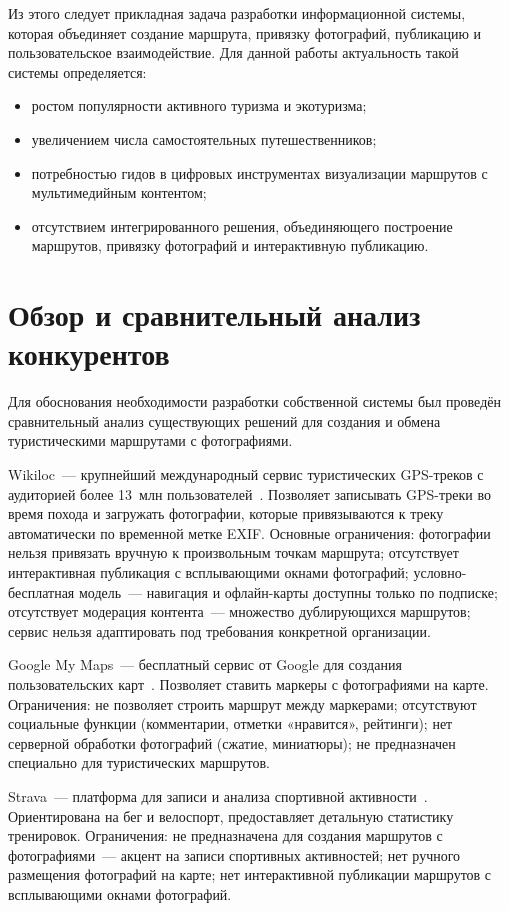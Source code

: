 Из этого следует прикладная задача разработки информационной системы, которая
объединяет создание маршрута, привязку фотографий, публикацию и пользовательское
взаимодействие. Для данной работы актуальность такой системы определяется:
\begin{itemize}
  \item ростом популярности активного туризма и экотуризма;
  \item увеличением числа самостоятельных путешественников;
  \item потребностью гидов в цифровых инструментах визуализации маршрутов с мультимедийным контентом;
  \item отсутствием интегрированного решения, объединяющего построение маршрутов, привязку фотографий и интерактивную публикацию.
\end{itemize}


\section{Обзор и сравнительный анализ конкурентов}
\label{sec:competitors}

Для обоснования необходимости разработки собственной системы был проведён сравнительный анализ существующих решений для создания и обмена туристическими маршрутами с фотографиями.

Wikiloc~--- крупнейший международный сервис туристических GPS-треков с аудиторией более 13~млн пользователей~\cite{wikiloc}. Позволяет записывать GPS-треки во время похода и загружать фотографии, которые привязываются к треку автоматически по временной метке EXIF. Основные ограничения: фотографии нельзя привязать вручную к произвольным точкам маршрута; отсутствует интерактивная публикация с всплывающими окнами фотографий; условно-бесплатная модель~--- навигация и офлайн-карты доступны только по подписке; отсутствует модерация контента~--- множество дублирующихся маршрутов; сервис нельзя адаптировать под требования конкретной организации.

Google My Maps~--- бесплатный сервис от Google для создания пользовательских карт~\cite{googlemymaps}. Позволяет ставить маркеры с фотографиями на карте. Ограничения: не позволяет строить маршрут между маркерами; отсутствуют социальные функции (комментарии, отметки «нравится», рейтинги); нет серверной обработки фотографий (сжатие, миниатюры); не предназначен специально для туристических маршрутов.

Strava~--- платформа для записи и анализа спортивной активности~\cite{strava}. Ориентирована на бег и велоспорт, предоставляет детальную статистику тренировок. Ограничения: не предназначена для создания маршрутов с фотографиями~--- акцент на записи спортивных активностей; нет ручного размещения фотографий на карте; нет интерактивной публикации маршрутов с всплывающими окнами фотографий.

